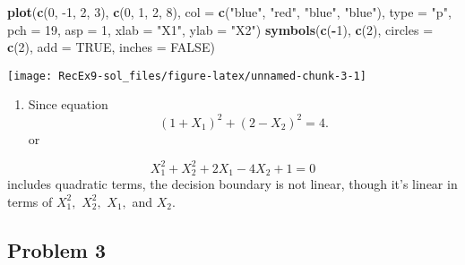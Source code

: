 \documentclass[]{article}
\newenvironment{Shaded}{\begin{snugshade}}{\end{snugshade}}
\newcommand{\DataTypeTok}[1]{\textcolor[rgb]{0.13,0.29,0.53}{#1}}
\newcommand{\DecValTok}[1]{\textcolor[rgb]{0.00,0.00,0.81}{#1}}
\newcommand{\KeywordTok}[1]{\textcolor[rgb]{0.13,0.29,0.53}{\textbf{#1}}}
\newcommand{\NormalTok}[1]{#1}
\newcommand{\OperatorTok}[1]{\textcolor[rgb]{0.81,0.36,0.00}{\textbf{#1}}}
\newcommand{\OtherTok}[1]{\textcolor[rgb]{0.56,0.35,0.01}{#1}}
\newcommand{\StringTok}[1]{\textcolor[rgb]{0.31,0.60,0.02}{#1}}
\providecommand{\tightlist}{%
  \setlength{\itemsep}{0pt}\setlength{\parskip}{0pt}}
\begin{document}
\begin{Shaded}
\begin{Highlighting}[]
\KeywordTok{plot}\NormalTok{(}\KeywordTok{c}\NormalTok{(}\DecValTok{0}\NormalTok{, }\DecValTok{-1}\NormalTok{, }\DecValTok{2}\NormalTok{, }\DecValTok{3}\NormalTok{), }\KeywordTok{c}\NormalTok{(}\DecValTok{0}\NormalTok{, }\DecValTok{1}\NormalTok{, }\DecValTok{2}\NormalTok{, }\DecValTok{8}\NormalTok{), }\DataTypeTok{col =} \KeywordTok{c}\NormalTok{(}\StringTok{"blue"}\NormalTok{, }\StringTok{"red"}\NormalTok{, }\StringTok{"blue"}\NormalTok{, }\StringTok{"blue"}\NormalTok{), }\DataTypeTok{type =} \StringTok{"p"}\NormalTok{, }
    \DataTypeTok{pch =} \DecValTok{19}\NormalTok{, }\DataTypeTok{asp =} \DecValTok{1}\NormalTok{, }\DataTypeTok{xlab =} \StringTok{"X1"}\NormalTok{, }\DataTypeTok{ylab =} \StringTok{"X2"}\NormalTok{)}
\KeywordTok{symbols}\NormalTok{(}\KeywordTok{c}\NormalTok{(}\OperatorTok{-}\DecValTok{1}\NormalTok{), }\KeywordTok{c}\NormalTok{(}\DecValTok{2}\NormalTok{), }\DataTypeTok{circles =} \KeywordTok{c}\NormalTok{(}\DecValTok{2}\NormalTok{), }\DataTypeTok{add =} \OtherTok{TRUE}\NormalTok{, }\DataTypeTok{inches =} \OtherTok{FALSE}\NormalTok{)}
\end{Highlighting}
\end{Shaded}

\texttt{[image: RecEx9-sol\_files/figure-latex/unnamed-chunk-3-1]}

\begin{enumerate}
\def\labelenumi{\alph{enumi})}
\setcounter{enumi}{3}
\tightlist
\item
  Since equation \[(1 + X_1)^2 + (2 - X_2)^2 = 4.\] or
\end{enumerate}

\[ X_1^2 + X_2^2 + 2X_1 - 4X_2 +1 = 0\] includes quadratic terms, the
decision boundary is not linear, though it's linear in terms of
\(X_1^2,\) \(X_2^2,\) \(X_1,\) and \(X_2.\)

\hypertarget{problem-3}{%
\subsection{Problem 3}\label{problem-3}}
\end{document}
